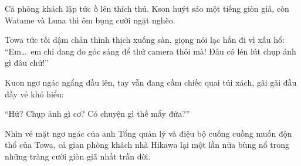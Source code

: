 \documentclass[../main.tex]{subfiles}
\begin{document}
Cả phòng khách lập tức ồ lên thích thú. Kson huýt sáo một tiếng giòn giã, còn Watame và Luna thì ôm bụng cười ngặt nghẽo.

Towa tức tối dậm chân thình thịch xuống sàn, giọng nói lạc hẳn đi vì xấu hổ: ``Em\dots\ em chỉ đang đo góc sáng để thử camera thôi mà! Đâu có lén lút chụp ảnh gì đâu chứ!''

Kuon ngơ ngác ngẩng đầu lên, tay vẫn đang cầm chiếc quai túi xách, gãi gãi đầu đầy vẻ khó hiểu:

``Hử? Chụp ảnh gì cơ? Có chuyện gì thế mấy đứa?''

Nhìn vẻ mặt ngơ ngác của anh Tổng quản lý và điệu bộ cuống cuồng muốn độn thổ của Towa, cả gian phòng khách nhà Hikawa lại một lần nữa bùng nổ trong những tràng cười giòn giã nhất trần đời.
\end{document}
